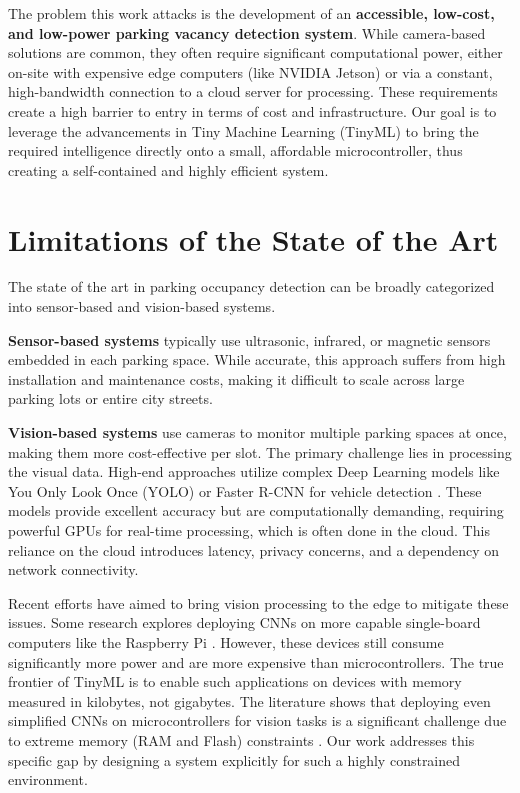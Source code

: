 \documentclass[sigconf,10pt,nonacm]{acmart}
\begin{document}
The problem this work attacks is the development of an \textbf{accessible, low-cost, and low-power parking vacancy detection system}. While camera-based solutions are common, they often require significant computational power, either on-site with expensive edge computers (like NVIDIA Jetson) or via a constant, high-bandwidth connection to a cloud server for processing. These requirements create a high barrier to entry in terms of cost and infrastructure. Our goal is to leverage the advancements in Tiny Machine Learning (TinyML) to bring the required intelligence directly onto a small, affordable microcontroller, thus creating a self-contained and highly efficient system.

\section{Limitations of the State of the Art}
\label{sec:limitations}
The state of the art in parking occupancy detection can be broadly categorized into sensor-based and vision-based systems.

\noindent\textbf{Sensor-based systems} typically use ultrasonic, infrared, or magnetic sensors embedded in each parking space. While accurate, this approach suffers from high installation and maintenance costs, making it difficult to scale across large parking lots or entire city streets.

\noindent\textbf{Vision-based systems} use cameras to monitor multiple parking spaces at once, making them more cost-effective per slot. The primary challenge lies in processing the visual data. High-end approaches utilize complex Deep Learning models like You Only Look Once (YOLO) or Faster R-CNN for vehicle detection \cite{yolo-parking}. These models provide excellent accuracy but are computationally demanding, requiring powerful GPUs for real-time processing, which is often done in the cloud. This reliance on the cloud introduces latency, privacy concerns, and a dependency on network connectivity.

Recent efforts have aimed to bring vision processing to the edge to mitigate these issues. Some research explores deploying CNNs on more capable single-board computers like the Raspberry Pi \cite{rpi-parking}. However, these devices still consume significantly more power and are more expensive than microcontrollers. The true frontier of TinyML is to enable such applications on devices with memory measured in kilobytes, not gigabytes. The literature shows that deploying even simplified CNNs on microcontrollers for vision tasks is a significant challenge due to extreme memory (RAM and Flash) constraints \cite{tinyml-challenges}. Our work addresses this specific gap by designing a system explicitly for such a highly constrained environment.
\end{document}
